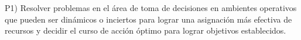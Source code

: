 P1) Resolver problemas en el \'{a}rea de toma de decisiones en ambientes
operativos que pueden ser din\'{a}micos o inciertos para lograr una
asignaci\'{o}n m\'{a}s efectiva de recursos y decidir el curso de acci\'{o}n
\'{o}ptimo para lograr objetivos establecidos.

